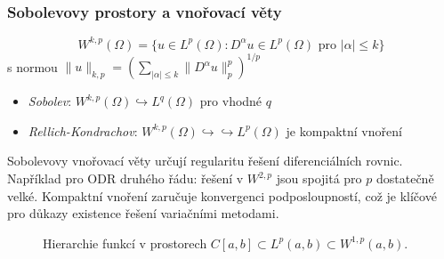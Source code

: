 \subsubsection{Sobolevovy prostory a vnořovací věty}

\begin{definition}
\[
W^{k,p}(\Omega) = \{ u \in L^p(\Omega) : D^\alpha u \in L^p(\Omega) \text{ pro } |\alpha| \leq k \}
\]
s normou $\|u\|_{k,p} = \left( \sum_{|\alpha| \leq k} \|D^\alpha u\|_p^p \right)^{1/p}$
\end{definition}

\begin{theorem}
\begin{itemize}
\item \emph{Sobolev}: $W^{k,p}(\Omega) \hookrightarrow L^q(\Omega)$ pro vhodné $q$
\item \emph{Rellich-Kondrachov}: $W^{k,p}(\Omega) \hookrightarrow\hookrightarrow L^p(\Omega)$ je kompaktní vnoření
\end{itemize}
\end{theorem}

\begin{keyinsight}
Sobolevovy vnořovací věty určují regularitu řešení diferenciálních rovnic. Například pro ODR druhého řádu: řešení v $W^{2,p}$ jsou spojitá pro $p$ dostatečně velké. Kompaktní vnoření zaručuje konvergenci podposloupností, což je klíčové pro důkazy existence řešení variačními metodami.
\end{keyinsight}

\begin{figure}[htbp]
    \centering
    \caption{Hierarchie funkcí v prostorech $C[a,b]\subset L^p(a,b)\subset W^{1,p}(a,b)$.}
    \label{fig:prostorova-hierarchie}
\end{figure}
        

